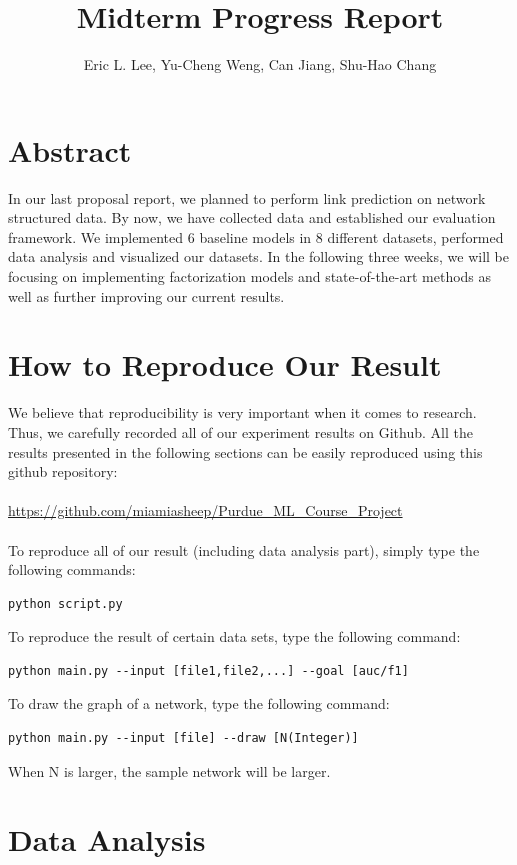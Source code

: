 \documentclass[12pt]{article}
\begin{document}
 
\title{Midterm Progress Report}
\author{Eric L. Lee, Yu-Cheng Weng, Can Jiang, Shu-Hao Chang} 
\maketitle

\section{Abstract}

In our last proposal report, we planned to perform link prediction on network structured data.
By now, we have collected data and established our evaluation framework. We implemented 6 baseline models in 8 different datasets, performed data analysis and visualized our datasets. In the following three weeks, we will be focusing on implementing factorization models and state-of-the-art methods as well as further improving our current results. 

\section{How to Reproduce Our Result}
We believe that reproducibility is very important when it comes to research. Thus, we carefully recorded all of our experiment results on Github. All the results presented in the following sections can be easily reproduced using this github repository: 
\\
\\
\url{https://github.com/miamiasheep/Purdue\_ML\_Course\_Project}
\\
\\
To reproduce all of our result (including data analysis part), simply type the following commands: 
\begin{lstlisting}
python script.py
\end{lstlisting}
To reproduce the result of certain data sets, type the following command:
\begin{lstlisting}
python main.py --input [file1,file2,...] --goal [auc/f1]
\end{lstlisting}
To draw the graph of a network, type the following command:
\begin{lstlisting}
python main.py --input [file] --draw [N(Integer)]
\end{lstlisting}
When N is larger, the sample network will be larger.

\section{Data Analysis}
\end{document}

